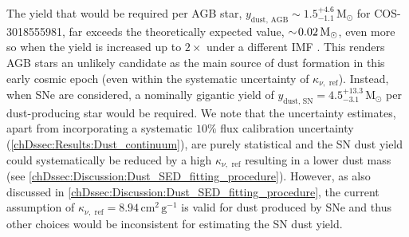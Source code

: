 The yield that would be required per AGB star, $y_\text{dust, AGB} \sim 1.5_{-1.1}^{+4.6} \, \mathrm{M_\odot}$ for COS-3018555981, far exceeds the theoretically expected value, $\sim \! 0.02 \, \mathrm{M_\odot}$, even more so when the yield is increased up to $2 \times$ under a different IMF \citep[as already shown for other EoR galaxies in e.g.][]{2015A&A...577A..80M, 2019A&A...624L..13L, 2022ApJ...928...31S}. This renders AGB stars an unlikely candidate as the main source of dust formation in this early cosmic epoch (even within the systematic uncertainty of $\kappa_{\nu, \text{ ref}}$). Instead, when SNe are considered, a nominally gigantic yield of $y_\text{dust, SN} = 4.5_{-3.1}^{+13.3} \, \mathrm{M_\odot}$ per dust-producing star would be required. We note that the uncertainty estimates, apart from incorporating a systematic $10 \%$ flux calibration uncertainty (\cref{chDssec:Results:Dust_continuum}), are purely statistical and the SN dust yield could systematically be reduced by a high $\kappa_{\nu, \text{ ref}}$ resulting in a lower dust mass (see \cref{chDssec:Discussion:Dust_SED_fitting_procedure}). However, as also discussed in \cref{chDssec:Discussion:Dust_SED_fitting_procedure}, the current assumption of $\kappa_{\nu, \text{ ref}} = 8.94 \, \mathrm{cm^2 \, g^{-1}}$ is valid for dust produced by SNe and thus other choices would be inconsistent for estimating the SN dust yield.

